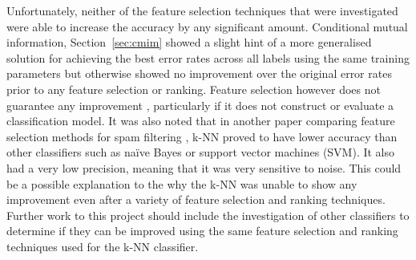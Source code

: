 Unfortunately, neither of the feature selection techniques that were investigated were able to increase the accuracy by any
significant amount. Conditional mutual information, Section~\ref{sec:cmim} showed a slight hint of a more generalised solution
for achieving the best error rates across all labels using the same training parameters but otherwise showed no improvement
over the original error rates prior to any feature selection or ranking. Feature selection however does not guarantee any
improvement \cite{stability_feature_ranking}, particularly if it does not construct or evaluate a classification model. It was
also noted that in another paper comparing feature selection methods for spam filtering \cite{mlmethods_spamfiltering}, k-NN
proved to have lower accuracy than other classifiers such as na\"{i}ve Bayes or support vector machines (SVM). It also had a
very low precision, meaning that it was very sensitive to noise. This could be a possible explanation to the why the k-NN was
unable to show any improvement even after a variety of feature selection and ranking techniques. Further work to this project
should include the investigation of other classifiers to determine if they can be improved using the same feature selection
and ranking techniques used for the k-NN classifier.

%
%
% 
% 
% 
% 
% 